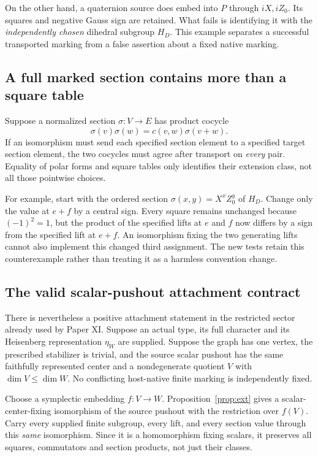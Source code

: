 On the other hand, a quaternion source does embed into $P$ through $iX,iZ_0$. Its squares and negative Gauss sign are retained. What fails is identifying it with the \emph{independently chosen} dihedral subgroup $H_D$. This example separates a successful transported marking from a false assertion about a fixed native marking.

\subsection{A full marked section contains more than a square table}
Suppose a normalized section $\sigma:V\to E$ has product cocycle
\[
 \sigma(v)\sigma(w)=c(v,w)\sigma(v+w).
\]
If an isomorphism must send each specified section element to a specified target section element, the two cocycles must agree after transport on \emph{every} pair. Equality of polar forms and square tables only identifies their extension class, not all those pointwise choices.

For example, start with the ordered section $\sigma(x,y)=X^xZ_0^y$ of $H_D$. Change only the value at $e+f$ by a central sign. Every square remains unchanged because $(-1)^2=1$, but the product of the specified lifts at $e$ and $f$ now differs by a sign from the specified lift at $e+f$. An isomorphism fixing the two generating lifts cannot also implement this changed third assignment. The new tests retain this counterexample rather than treating it as a harmless convention change.

\subsection{The valid scalar-pushout attachment contract}
There is nevertheless a positive attachment statement in the restricted sector already used by Paper XI. Suppose an actual type, its full character and its Heisenberg representation $\eta_W$ are supplied. Suppose the graph has one vertex, the prescribed stabilizer is trivial, and the source scalar pushout has the same faithfully represented center and a nondegenerate quotient $V$ with $\dim V\le\dim W$. No conflicting host-native finite marking is independently fixed.

Choose a symplectic embedding $f:V\to W$. Proposition~\ref{prop:ext} gives a scalar-center-fixing isomorphism of the source pushout with the restriction over $f(V)$. Carry every supplied finite subgroup, every lift, and every section value through this \emph{same} isomorphism. Since it is a homomorphism fixing scalars, it preserves all squares, commutators and section products, not just their classes.

